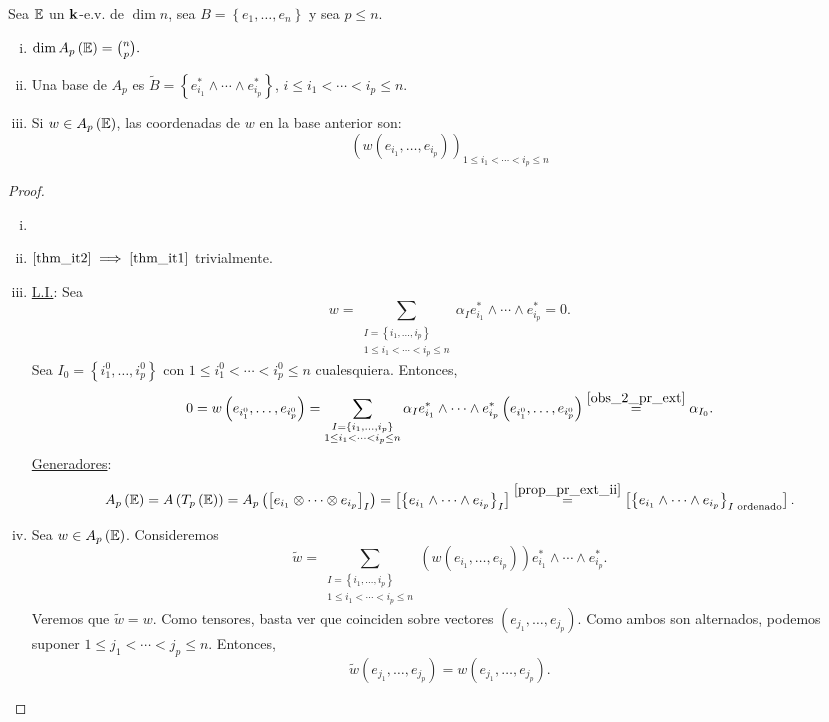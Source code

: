 \begin{thm}
    Sea $\mathbb{E}$ un $\mathbf{k}$-e.v. de $\dim n$, sea $B=\left\{
    e_1, \dots , e_n\right\}$ y sea $p\leq n$.
    \begin{enumerate}[i)]
        \item \label{thm_it1}
            $ \dim A_p\left( \mathbb{E} \right) = \binom{n}{p}. $
        \item \label{thm_it2}
            Una base de $A_p$ es $\tilde{B} = \left\{e_{i_1}^* \wedge \cdots \wedge e_{i_p}^* \right\}$, $i\leq i_1 < \cdots < i_p \leq n$.
        \item 
        	Si $w \in A_p\left( \mathbb{E} \right)$, las coordenadas de $w$ en la base anterior son:
        	\[
        		\left( w \left( e_{i_1}, \dots , e_{i_p} \right) \right)_{1\leq i_1 < \cdots < i_p \leq n}
        	\]
    \end{enumerate}
\end{thm}
\begin{proof}
	\begin{enumerate}[i)]
		\item[]
		\item 
			$\ref{thm_it2} \implies \ref{thm_it1}$ trivialmente.
		\item 
			\underline{L.I.}: Sea
			\[
				w=\sum_{\substack{I=\left\{ i_1, \dots , i_p \right\} \\ 1\leq i_1 < \cdots < i_p \leq n}} \alpha _I e_{i_1}^* \wedge \cdots \wedge e_{i_p}^*=0.
			\]
			Sea $I_0=\left\{ i_1^0, \dots , i_p^0 \right\} $ con $1\leq i_1^0 < \cdots < i_p^0 \leq n$ cualesquiera. Entonces, 
			\[
				0=w \left( e_{i_1^0} , \dots , e_{i_p^0} \right)= \sum_{\substack{I=\left\{ i_1, \dots , i_p \right\} \\ 1\leq i_1 < \cdots < i_p \leq n}} \alpha _I e_{i_1}^* \wedge \cdots \wedge e_{i_p}^* \left( e_{i_1^0} , \dots , e_{i_p^0} \right) \stackrel{\ref{obs_2_pr_ext}} = \alpha _ {I_0}.
			\]
			\underline{Generadores}:
			\[
				A_p \left( \mathbb{E} \right) = A \left( T_p \left( \mathbb{E} \right) \right) = A_p \left( \left[ e_{i_1} \otimes \cdots \otimes e_{i_p} \right]_I \right) = \left[ \left\{ e_{i_1} \wedge \cdots \wedge e_{i_p} \right\}_I \right] \stackrel{\ref{prop_pr_ext_ii}}= \left[ \left\{ e_{i_1} \wedge \cdots \wedge e_{i_p} \right\}_{I\text{ ordenado}} \right].
			\]
		\item
			Sea $w \in A_p\left(\mathbb{E}\right)$. Consideremos
			\[
				\tilde{w}=\sum_{\substack{I=\left\{ i_1, \dots , i_p \right\} \\ 1\leq i_1 < \cdots < i_p \leq n}} \left( w \left( e_{i_1} , \dots , e_{i_p} \right) \right) e_{i_1}^* \wedge \cdots \wedge e_{i_p}^*.
			\]
			Veremos que $\tilde{w}=w$. Como tensores, basta ver que coinciden sobre vectores $\left( e_{j_1}, \dots , e_{j_p} \right)$. Como ambos son alternados, podemos suponer $1 \leq j_1  < \cdots < j_p \leq n$. Entonces,
			\[
				\tilde{w} \left( e_{j_1}, \dots , e_{j_p} \right) = w \left( e_{j_1}, \dots , e_{j_p} \right).
			\]
		
	\end{enumerate}
\end{proof}

